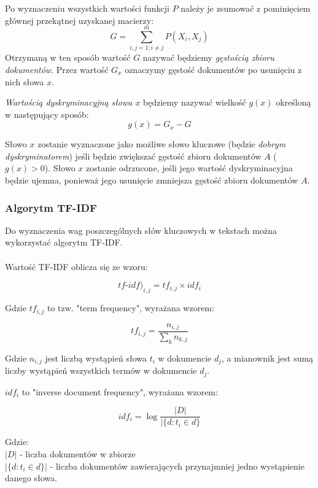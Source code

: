 \documentclass{classrep}
\begin{document}
Po wyznaczeniu wszystkich wartości funkcji $P$ należy je zsumować z pominięciem głównej przekątnej uzyskanej macierzy:
\begin{equation}
 G = \sum _{i, j = 1; i \neq j}^{m} P(X_i, X_j)
\end{equation}
Otrzymaną w ten sposób wartość $G$ nazywać będziemy \textit{gęstością zbioru dokumentów}. Przez wartość $G_x$ oznaczymy gęstość dokumentów po usunięciu z nich słowa $x$.

\textit{Wartością dyskryminacyjną słowa $x$} będziemy nazywać wielkość $g(x)$ określoną w następujący sposób:
\begin{equation}
 g(x) = G_x - G
\end{equation}

Słowo $x$ zostanie wyznaczone jako możliwe słowo kluczowe (będzie \textit{dobrym dyskryminatorem}) jeśli będzie zwiększać gęstość zbioru dokumentów $A$ ($g(x) > 0$). Słowo $x$ zostanie odrzucone, jeśli jego wartość dyskryminacyjna będzie ujemna, ponieważ jego usunięcie zmniejsza gęstość zbioru dokumentów $A$.

\subsubsection{Algorytm TF-IDF}  
Do wyznaczenia wag poszczególnych słów kluczowych w tekstach można wykorzystać algorytm 
TF-IDF.

\paragraph{}
Wartość TF-IDF oblicza się ze wzoru:

$$ tf\mbox{-}idf)_{i,j} = tf_{i,j} \times  idf_{i}$$

Gdzie $tf_{i, j}$ to tzw. "term frequency", wyrażana wzorem:

$$ tf_{i,j} = \frac{n_{i,j}}{\sum_k n_{k,j}}$$

Gdzie $n_{i,j}$ jest liczbą wystąpień słowa $t_{i}$ w dokumencie $d_{j}$, a mianownik jest sumą liczby wystąpień wszystkich termów w dokumencie $d_{j}$.


$idf_{i}$ to "inverse document frequency", wyrażana wzorem:

$$idf_{i} =  \log \frac{|D|}{|\{d: t_{i} \in d\}}$$

Gdzie:\\
$|D|$ - liczba dokumentów w zbiorze\\
$|\{d : t_{i} \in d\}|$ - liczba dokumentów zawierających przynajmniej jedno wystąpienie danego słowa.
\end{document}
